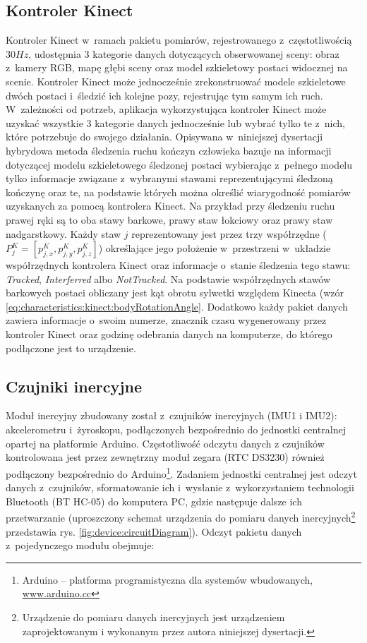 \subsection{Kontroler Kinect}
Kontroler Kinect w~ramach pakietu pomiarów, rejestrowanego z~częstotliwością $30 Hz$, udostępnia 3 kategorie danych dotyczących obserwowanej sceny: obraz z~kamery RGB, mapę głębi sceny oraz model szkieletowy postaci widocznej na scenie. Kontroler Kinect może jednocześnie zrekonstruować modele szkieletowe dwóch postaci i~śledzić ich kolejne pozy, rejestrując tym samym ich ruch. W~zależności od potrzeb, aplikacja wykorzystująca kontroler Kinect może uzyskać wszystkie 3 kategorie danych jednocześnie lub wybrać tylko te z~nich, które potrzebuje do swojego działania. Opisywana w~niniejszej dysertacji hybrydowa metoda śledzenia ruchu kończyn człowieka bazuje na informacji dotyczącej modelu szkieletowego śledzonej postaci wybierając z~pełnego modelu tylko informacje związane z~wybranymi stawami reprezentującymi śledzoną kończynę oraz te, na podstawie których można określić wiarygodność pomiarów uzyskanych za pomocą kontrolera Kinect. Na przykład przy śledzeniu ruchu prawej ręki są to oba stawy barkowe, prawy staw łokciowy oraz prawy staw nadgarstkowy. Każdy staw $j$ reprezentowany jest przez trzy współrzędne ($P^K_j = [p^K_{j,x}, p^K_{j,y}, p^K_{j,z}]$) określające jego położenie w~przestrzeni w~układzie współrzędnych kontrolera Kinect oraz informacje o~stanie śledzenia tego stawu: \emph{Tracked}, \emph{Interferred} albo \emph{NotTracked}. Na podstawie współrzędnych stawów barkowych postaci obliczany jest kąt obrotu sylwetki względem Kinecta (wzór \ref{eq:characteristics:kinect:bodyRotationAngle}. Dodatkowo każdy pakiet danych zawiera informacje o~swoim numerze, znacznik czasu wygenerowany przez kontroler Kinect oraz godzinę odebrania danych na komputerze, do którego podłączone jest to urządzenie.
		
\subsection{Czujniki inercyjne}
Moduł inercyjny zbudowany został z~czujników inercyjnych (IMU1 i IMU2): akcelerometru i~żyroskopu, podłączonych bezpośrednio do jednostki centralnej opartej na platformie Arduino. Częstotliwość odczytu danych z czujników kontrolowana jest przez zewnętrzny moduł zegara (RTC DS3230) również podłączony bezpośrednio do Arduino\footnote{Arduino -- platforma programistyczna dla systemów wbudowanych, \url{www.arduino.cc}}. Zadaniem jednostki centralnej jest odczyt danych z~czujników, sformatowanie ich i~wysłanie z~wykorzystaniem technologii Bluetooth (BT HC-05) do komputera PC, gdzie następuje dalsze ich przetwarzanie (uproszczony schemat urządzenia do pomiaru danych inercyjnych\footnote{Urządzenie do pomiaru danych inercyjnych jest urządzeniem zaprojektowanym i wykonanym przez autora niniejszej dysertacji.} przedstawia rys. \ref{fig:device:circuitDiagram}). Odczyt pakietu danych z~pojedynczego modułu obejmuje:

